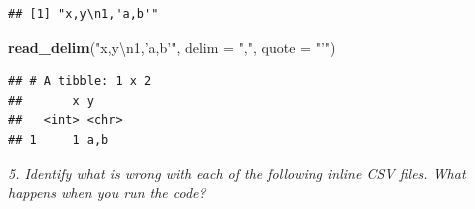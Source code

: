 \documentclass[]{book}
\newenvironment{Shaded}{\begin{snugshade}}{\end{snugshade}}
\newcommand{\CharTok}[1]{\textcolor[rgb]{0.31,0.60,0.02}{#1}}
\newcommand{\DataTypeTok}[1]{\textcolor[rgb]{0.13,0.29,0.53}{#1}}
\newcommand{\KeywordTok}[1]{\textcolor[rgb]{0.13,0.29,0.53}{\textbf{#1}}}
\newcommand{\NormalTok}[1]{#1}
\newcommand{\StringTok}[1]{\textcolor[rgb]{0.31,0.60,0.02}{#1}}
\theoremstyle{definition}
\theoremstyle{definition}
\theoremstyle{definition}
\theoremstyle{remark}
\begin{document}
\begin{verbatim}
## [1] "x,y\n1,'a,b'"
\end{verbatim}

\begin{Shaded}
\begin{Highlighting}[]
\KeywordTok{read_delim}\NormalTok{(}\StringTok{"x,y}\CharTok{\textbackslash{}n}\StringTok{1,'a,b'"}\NormalTok{, }\DataTypeTok{delim =} \StringTok{","}\NormalTok{, }\DataTypeTok{quote =} \StringTok{"'"}\NormalTok{)}
\end{Highlighting}
\end{Shaded}

\begin{verbatim}
## # A tibble: 1 x 2
##       x y    
##   <int> <chr>
## 1     1 a,b
\end{verbatim}

\emph{5. Identify what is wrong with each of the following inline CSV
files. What happens when you run the code?}
\end{document}
